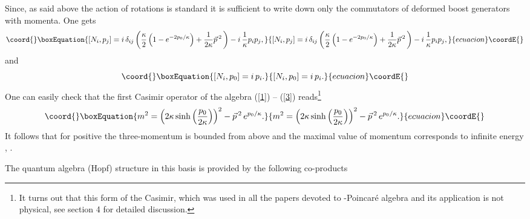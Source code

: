 \documentclass[a4paper,a4paper]{article}
\begin{document}
Since, as said above the action of rotations is standard it is
sufficient to write down only the commutators  of deformed boost
generators with momenta. One gets \cite{maru}
\begin{equation}\coord{}\boxEquation{\label{2}
   \left[N_{i}, p_{j}\right] = i\,  \delta_{ij}
 \left( {\kappa\over 2} \left(
 1 -e^{-2{p_{0}/ \kappa}}
\right) + {1\over 2\kappa} \vec{p}\,{}^{ 2}\, \right) - i\,
{1\over \kappa} p_{i}p_{j} ,
}{\left[N_{i}, p_{j}\right] = i\,  \delta_{ij}
 \left( {\kappa\over 2} \left(
 1 -e^{-2{p_{0}/ \kappa}}
\right) + {1\over 2\kappa} \vec{p}\,{}^{ 2}\, \right) - i\,
{1\over \kappa} p_{i}p_{j} ,
}{ecuacion}\coordE{}\end{equation}
and
\begin{equation}\coord{}\boxEquation{\label{3}
  \left[N_{i},p_{0}\right] = i\, p_{i}.
}{\left[N_{i},p_{0}\right] = i\, p_{i}.
}{ecuacion}\coordE{}\end{equation}
One can easily check that the first Casimir operator of the
algebra (\ref{1}) -- (\ref{3})  reads\footnote{It turns out that
this form of the Casimir, which was used in all the papers devoted
to \myHighlight{$\kappa$}\coordHE{}-Poincar\'e algebra and its application is not
physical, see section 4 for detailed discussion.}
\begin{equation}\coord{}\boxEquation{\label{6}
 m^2 = \left(2\kappa \sinh \left(\frac{p_0}{2\kappa}\right)\right)^2 - \vec{p}\,{}^2\, e^{p_0/\kappa}.
}{m^2 = \left(2\kappa \sinh \left(\frac{p_0}{2\kappa}\right)\right)^2 - \vec{p}\,{}^2\, e^{p_0/\kappa}.
}{ecuacion}\coordE{}\end{equation}
It follows that for positive \myHighlight{$\kappa$}\coordHE{} the three-momentum is
bounded from  above \coordHE{} and the maximal
value of momentum corresponds to infinite energy \cite{jkgminl},
\cite{rbgacjkg}.
\newline

The quantum algebra (Hopf) structure in this basis is provided by the following co-products
\end{document}
